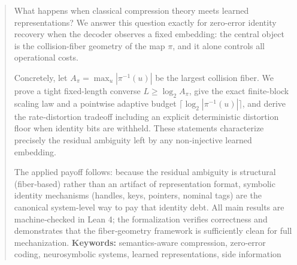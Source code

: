 \begin{abstract}
What happens when classical compression theory meets learned representations? We answer this question exactly for zero-error identity recovery when the decoder observes a fixed embedding: the central object is the collision-fiber geometry of the map $\pi$, and it alone controls all operational costs.

Concretely, let $A_{\pi}=\max_u |\pi^{-1}(u)|$ be the largest collision fiber. We prove a tight fixed-length converse $L \ge \log_2 A_{\pi}$, give the exact finite-block scaling law and a pointwise adaptive budget $\lceil \log_2 |\pi^{-1}(u)|\rceil$, and derive the rate‑distortion tradeoff including an explicit deterministic distortion floor when identity bits are withheld. These statements characterize precisely the residual ambiguity left by any non‑injective learned embedding.

The applied payoff follows: because the residual ambiguity is structural (fiber‑based) rather than an artifact of representation format, symbolic identity mechanisms (handles, keys, pointers, nominal tags) are the canonical system-level way to pay that identity debt. All main results are machine‑checked in Lean 4; the formalization verifies correctness and demonstrates that the fiber‑geometry framework is sufficiently clean for full mechanization.
\textbf{Keywords:} semantics-aware compression, zero-error coding, neurosymbolic systems, learned representations, side information
\end{abstract}
